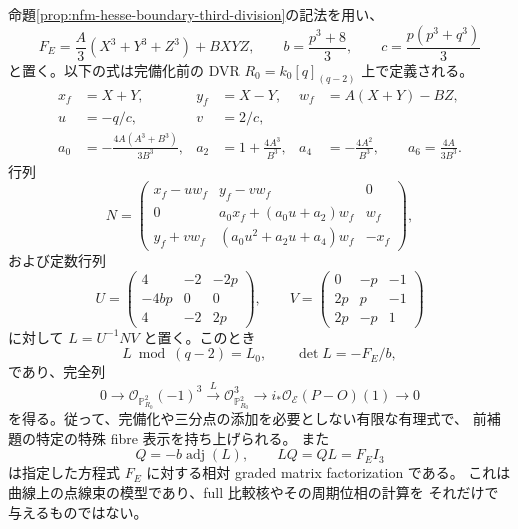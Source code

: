 \begin{lemma}[境界の点線束の有理式による相対表示]
\label{lem:nfm-hesse-boundary-explicit-line}
命題\ref{prop:nfm-hesse-boundary-third-division}の記法を用い、
\[
 F_E=\frac A3(X^3+Y^3+Z^3)+BXYZ,\qquad
 b=\frac{p^3+8}{3},\qquad c=\frac{p(p^3+q^3)}3
\]
と置く。以下の式は完備化前の DVR
$R_0=k_0[q]_{(q-2)}$ 上で定義される。
\begin{align*}
 x_f&=X+Y,&y_f&=X-Y,&w_f&=A(X+Y)-BZ,\\
 u&=-q/c,&v&=2/c,\\
 a_0&=-\frac{4A(A^3+B^3)}{3B^3},&
 a_2&=1+\frac{4A^3}{B^3},&
 a_4&=-\frac{4A^2}{B^3},\qquad
 a_6=\frac{4A}{3B^3}.
\end{align*}
行列
\[
 N=\begin{pmatrix}
 x_f-uw_f&y_f-vw_f&0\\
 0&a_0x_f+(a_0u+a_2)w_f&w_f\\
 y_f+vw_f&(a_0u^2+a_2u+a_4)w_f&-x_f
 \end{pmatrix},
\]
および定数行列
\[
 U=\begin{pmatrix}4&-2&-2p\\-4bp&0&0\\4&-2&2p\end{pmatrix},
 \qquad
 V=\begin{pmatrix}0&-p&-1\\2p&p&-1\\2p&-p&1\end{pmatrix}
\]
に対して $L=U^{-1}NV$ と置く。このとき
\[
 L\bmod(q-2)=L_0,\qquad
 \det L=-F_E/b,
\]
であり、完全列
\[
 0\longrightarrow\mathcal O_{\mathbb P^2_{R_0}}(-1)^3
 \xrightarrow{\ L\ }\mathcal O_{\mathbb P^2_{R_0}}^3
 \longrightarrow i_*\mathcal O_{\mathcal E}(P-O)(1)
 \longrightarrow0
\]
を得る。従って、完備化や三分点の添加を必要としない有限な有理式で、
前補題の特定の特殊 fibre 表示を持ち上げられる。
また
\[
 Q=-b\operatorname{adj}(L),\qquad LQ=QL=F_E I_3
\]
は指定した方程式 $F_E$ に対する相対 graded matrix factorization である。
これは曲線上の点線束の模型であり、full 比較核やその周期位相の計算を
それだけで与えるものではない。
\end{lemma}
